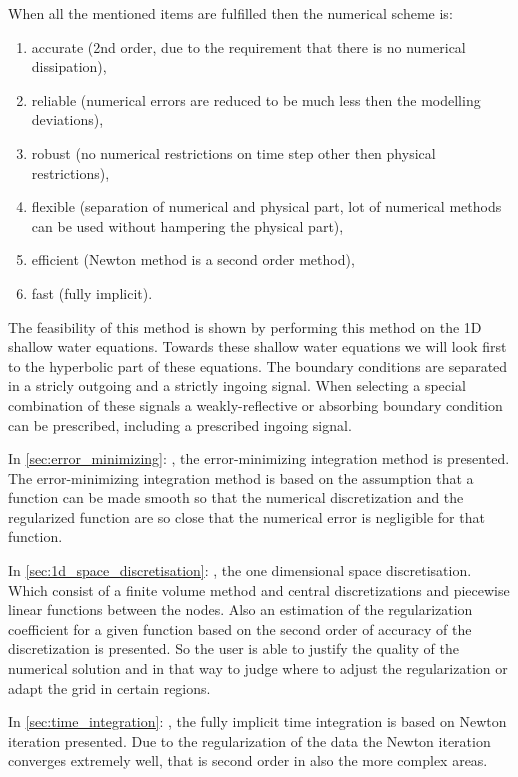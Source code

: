 When all the mentioned items are fulfilled then the numerical scheme is:
\begin{enumerate}
\item accurate (2nd order, due to the requirement that there is no numerical dissipation),
\item reliable (numerical errors are reduced to be much less then the modelling deviations),
\item robust (no numerical restrictions on time step other then physical restrictions),
\item flexible (separation of numerical and physical part, lot of numerical methods can be used without hampering the physical part),
\item efficient (Newton method is a second order method),
\item fast (fully implicit).
\end{enumerate}

The feasibility of this method is shown by performing this method on the 1D shallow water equations.
Towards these shallow water equations we will look first to the hyperbolic part of these equations.
The boundary conditions are separated in a stricly outgoing and a strictly ingoing signal.
When selecting a special combination of these signals a weakly-reflective or absorbing boundary condition can be prescribed, including a prescribed ingoing signal.




In \autoref{sec:error_minimizing}: , the error-minimizing integration method is presented.
The error-minimizing integration method is based on the assumption that a function can be made smooth so that the numerical discretization and the regularized function are so close that the numerical error is negligible for that function.

In \autoref{sec:1d_space_discretisation}: , the one dimensional space discretisation.
Which consist of a finite volume method and central discretizations and piecewise linear functions between the nodes.
Also an estimation of the regularization coefficient for a given function based on the second order of accuracy of the discretization is presented.
So the user is able to justify the quality of the numerical solution and in that way to judge where to adjust the regularization or adapt the grid in certain regions.


In \autoref{sec:time_integration}: , the fully implicit time integration is based on Newton iteration presented. Due to the regularization of the data the Newton iteration converges extremely well, that is second order in also the more complex areas.

